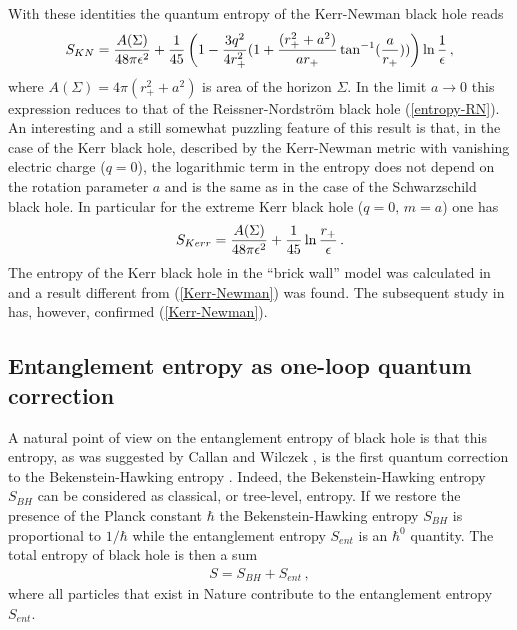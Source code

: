 \documentclass[12pt]{article}
\def\be{\begin{eqnarray}}
\def\ee{\end{eqnarray}}
\def\lb{\label}
\def\o{\over}
\begin{document}
With these identities the quantum entropy of the Kerr-Newman black hole reads \cite{Mann:1996bi}
\be
S_{KN}={A(\Sigma) \over 48\pi \epsilon^2} 
+{1\over 45}
\left( 1 -{3q^2\over 4r^2_+}  (1+{(r^2_++a^2)\over a r_+} \tan^{-1}({a\over r_+}))\right)\ln {1\o \epsilon}\, ,
\label{Kerr-Newman}
\ee
where $A(\Sigma)=4\pi (r^2_++a^2)$ is area of the horizon $\Sigma$.
In the limit $a\rightarrow 0$ this expression reduces to that of the
Reissner-Nordstr\"{o}m black hole (\ref{entropy-RN}). An interesting and a still  somewhat puzzling feature of this result is that, 
in the case of the Kerr black hole,  described by the Kerr-Newman metric with vanishing electric charge ($q=0$), the logarithmic term in the entropy does not depend on the rotation parameter $a$ and is the same as in the case of the Schwarzschild black hole. In particular for the extreme Kerr black hole ($q=0,\, m=a$) one has
\be
S_{Kerr}={A(\Sigma)\o 48\pi\epsilon^2}+{1\o 45}\ln{r_+\over \epsilon}\, .
\lb{Kerr}
\ee
The entropy of the Kerr black hole in the ``brick wall'' model was calculated in \cite{Cognola:1997dv} and a result different from (\ref{Kerr-Newman})   was found. 
The subsequent study in \cite{Frolov:1999gy} has, however, confirmed (\ref{Kerr-Newman}). 

\subsection{Entanglement entropy as one-loop quantum correction}
A natural point of view on the entanglement entropy of black hole is that this entropy, as was  suggested by Callan and Wilczek \cite{Callan:1994py}, is the first quantum correction to the Bekenstein-Hawking entropy
   .
Indeed, the Bekenstein-Hawking entropy $S_{BH}$ can be considered as classical, or tree-level,  entropy. If we restore the presence of the Planck constant $\hbar$ the Bekenstein-Hawking entropy $S_{BH}$ is proportional to $1/\hbar$ while the entanglement entropy $S_{ent}$ is an $\hbar^0$ quantity. The total entropy of black hole is then a sum 
\be
S=S_{BH}+S_{ent}\, ,
\lb{total entropy}
\ee
where all particles that exist in Nature contribute to the entanglement entropy $S_{ent}$. 
\end{document}
